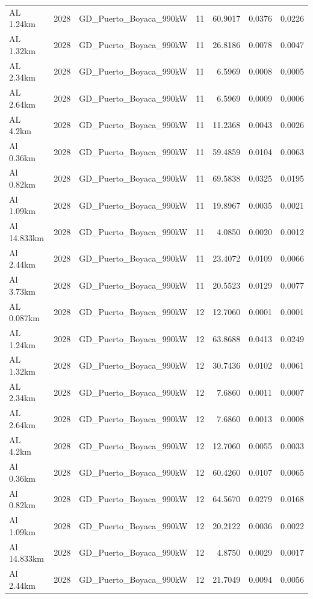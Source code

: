 \documentclass[11pt,a4paper]{article}
\begin{document}
\begin{longtable}{llllrrr}
AL 1.24km & 2028 & GD\_Puerto\_Boyaca\_990kW & 11 & 60.9017 & 0.0376 & 0.0226 \\
AL 1.32km & 2028 & GD\_Puerto\_Boyaca\_990kW & 11 & 26.8186 & 0.0078 & 0.0047 \\
AL 2.34km & 2028 & GD\_Puerto\_Boyaca\_990kW & 11 & 6.5969 & 0.0008 & 0.0005 \\
AL 2.64km & 2028 & GD\_Puerto\_Boyaca\_990kW & 11 & 6.5969 & 0.0009 & 0.0006 \\
AL 4.2km & 2028 & GD\_Puerto\_Boyaca\_990kW & 11 & 11.2368 & 0.0043 & 0.0026 \\
Al 0.36km & 2028 & GD\_Puerto\_Boyaca\_990kW & 11 & 59.4859 & 0.0104 & 0.0063 \\
Al 0.82km & 2028 & GD\_Puerto\_Boyaca\_990kW & 11 & 69.5838 & 0.0325 & 0.0195 \\
Al 1.09km & 2028 & GD\_Puerto\_Boyaca\_990kW & 11 & 19.8967 & 0.0035 & 0.0021 \\
Al 14.833km & 2028 & GD\_Puerto\_Boyaca\_990kW & 11 & 4.0850 & 0.0020 & 0.0012 \\
Al 2.44km & 2028 & GD\_Puerto\_Boyaca\_990kW & 11 & 23.4072 & 0.0109 & 0.0066 \\
Al 3.73km & 2028 & GD\_Puerto\_Boyaca\_990kW & 11 & 20.5523 & 0.0129 & 0.0077 \\
AL 0.087km & 2028 & GD\_Puerto\_Boyaca\_990kW & 12 & 12.7060 & 0.0001 & 0.0001 \\
AL 1.24km & 2028 & GD\_Puerto\_Boyaca\_990kW & 12 & 63.8688 & 0.0413 & 0.0249 \\
AL 1.32km & 2028 & GD\_Puerto\_Boyaca\_990kW & 12 & 30.7436 & 0.0102 & 0.0061 \\
AL 2.34km & 2028 & GD\_Puerto\_Boyaca\_990kW & 12 & 7.6860 & 0.0011 & 0.0007 \\
AL 2.64km & 2028 & GD\_Puerto\_Boyaca\_990kW & 12 & 7.6860 & 0.0013 & 0.0008 \\
AL 4.2km & 2028 & GD\_Puerto\_Boyaca\_990kW & 12 & 12.7060 & 0.0055 & 0.0033 \\
Al 0.36km & 2028 & GD\_Puerto\_Boyaca\_990kW & 12 & 60.4260 & 0.0107 & 0.0065 \\
Al 0.82km & 2028 & GD\_Puerto\_Boyaca\_990kW & 12 & 64.5670 & 0.0279 & 0.0168 \\
Al 1.09km & 2028 & GD\_Puerto\_Boyaca\_990kW & 12 & 20.2122 & 0.0036 & 0.0022 \\
Al 14.833km & 2028 & GD\_Puerto\_Boyaca\_990kW & 12 & 4.8750 & 0.0029 & 0.0017 \\
Al 2.44km & 2028 & GD\_Puerto\_Boyaca\_990kW & 12 & 21.7049 & 0.0094 & 0.0056 \\

\end{longtable}
\end{document}
